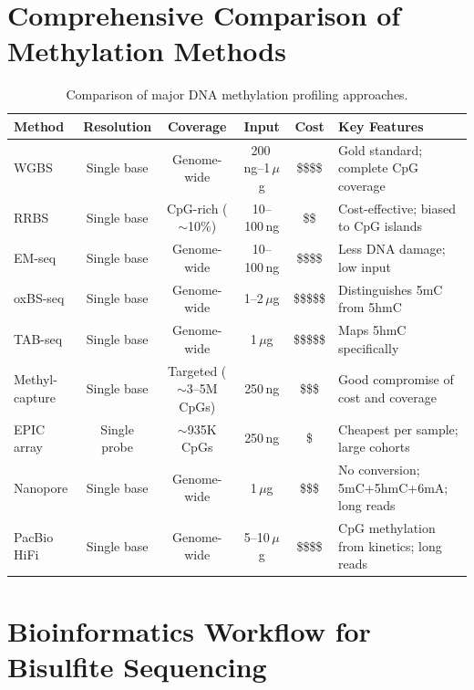 \section{Comprehensive Comparison of Methylation Methods}
\label{sec:methylation:comparison}

\begin{table}[htbp]
\centering
\caption[Comparison of DNA methylation profiling methods.]{Comparison of major DNA methylation profiling approaches.}
\label{tab:methylation:comparison}
\small
\begin{tabularx}{\textwidth}{l c c c c X}
\toprule
\textbf{Method} & \textbf{Resolution} & \textbf{Coverage} & \textbf{Input} & \textbf{Cost} & \textbf{Key Features} \\
\midrule
WGBS & Single base & Genome-wide & 200\,ng--1\,$\mu$g & \$\$\$\$ & Gold standard; complete CpG coverage \\
\addlinespace
RRBS & Single base & CpG-rich ($\sim$10\%) & 10--100\,ng & \$\$ & Cost-effective; biased to CpG islands \\
\addlinespace
EM-seq & Single base & Genome-wide & 10--100\,ng & \$\$\$\$ & Less DNA damage; low input \\
\addlinespace
oxBS-seq & Single base & Genome-wide & 1--2\,$\mu$g & \$\$\$\$\$ & Distinguishes 5mC from 5hmC \\
\addlinespace
TAB-seq & Single base & Genome-wide & 1\,$\mu$g & \$\$\$\$\$ & Maps 5hmC specifically \\
\addlinespace
Methyl-capture & Single base & Targeted ($\sim$3--5M CpGs) & 250\,ng & \$\$\$ & Good compromise of cost and coverage \\
\addlinespace
EPIC array & Single probe & $\sim$935K CpGs & 250\,ng & \$ & Cheapest per sample; large cohorts \\
\addlinespace
Nanopore & Single base & Genome-wide & 1\,$\mu$g & \$\$\$ & No conversion; 5mC+5hmC+6mA; long reads \\
\addlinespace
PacBio HiFi & Single base & Genome-wide & 5--10\,$\mu$g & \$\$\$\$ & CpG methylation from kinetics; long reads \\
\bottomrule
\end{tabularx}
\end{table}

\section{Bioinformatics Workflow for Bisulfite Sequencing}
\label{sec:methylation:bioinformatics}

